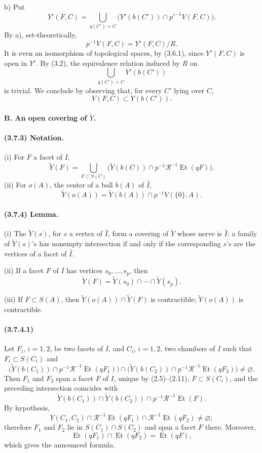 \documentclass[10pt]{article}
\begin{document}
b) Put
\[
Y'(F,C)=
\bigcup_{q(C')=C}
\bigl(Y'(b(C'))\cap p'^{-1}V(F,C)\bigr).
\]
By a), set-theoretically,
\[
p^{-1}V(F,C)=Y'(F,C)/R.
\]
It is even an isomorphism of topological spaces, by (3.6.1), since \(Y'(F,C)\) is open in \(Y'\). By (3.2), the equivalence relation induced by \(R\) on
\[
\bigcup_{q(C')=C}Y'(b(C'))
\]
is trivial. We conclude by observing that, for every \(C'\) lying over \(C\),
\[
V(F,C)\subset Y(b(C')).
\]

\paragraph{B. An open covering of \(\widetilde Y\).}

\paragraph{(3.7.3) Notation.} (i) For \(F\) a facet of \(I\),
\[
\widetilde Y(F)=
\bigcup_{F\subset S(C)}
\bigl(\widetilde Y(b(C))\cap p^{-1}\mathcal R^{-1}\operatorname{Et}(qF)\bigr).
\]
(ii) For \(o(A)\), the center of a ball \(b(A)\) of \(\widehat I\),
\[
\widetilde Y(o(A))=\widetilde Y(b(A))\cap p^{-1}V(\{0\},A).
\]

\paragraph{(3.7.4) Lemma.} (i) The \(\widetilde Y(s)\), for \(s\) a vertex of \(\widehat I\), form a covering of \(\widetilde Y\) whose nerve is \(\widehat I\): a family of \(\widetilde Y(s)\)'s has nonempty intersection if and only if the corresponding \(s\)'s are the vertices of a facet of \(\widehat I\).

(ii) If a facet \(F\) of \(I\) has vertices \(s_0,\ldots,s_p\), then
\[
\widetilde Y(F)=\widetilde Y(s_0)\cap\cdots\cap\widetilde Y(s_p).
\]

(iii) If \(F\subset S(A)\), then \(\widetilde Y(o(A))\cap\widetilde Y(F)\) is contractible; \(\widetilde Y(o(A))\) is contractible.

\paragraph{(3.7.4.1)} Let \(F_i\), \(i=1,2\), be two facets of \(I\), and \(C_i\), \(i=1,2\), two chambers of \(I\) such that \(F_i\subset S(C_i)\) and
\[
\bigl(\widetilde Y(b(C_1))\cap p^{-1}\mathcal R^{-1}\operatorname{Et}(qF_1)\bigr)
\cap
\bigl(\widetilde Y(b(C_2))\cap p^{-1}\mathcal R^{-1}\operatorname{Et}(qF_2)\bigr)
\ne\varnothing.
\]
Then \(F_1\) and \(F_2\) span a facet \(F\) of \(I\), unique by (2.5)--(2.11), \(F\subset S(C_i)\), and the preceding intersection coincides with
\[
\widetilde Y(b(C_1))\cap \widetilde Y(b(C_2))
\cap p^{-1}\mathcal R^{-1}\operatorname{Et}(F).
\]
By hypothesis,
\[
Y(C_1,C_2)\cap\mathcal R^{-1}\operatorname{Et}(qF_1)\cap
\mathcal R^{-1}\operatorname{Et}(qF_2)\ne\varnothing;
\]
therefore \(F_1\) and \(F_2\) lie in \(S(C_1)\cap S(C_2)\) and span a facet \(F\) there. Moreover,
\[
\operatorname{Et}(qF_1)\cap\operatorname{Et}(qF_2)=\operatorname{Et}(qF),
\]
which gives the announced formula.
\end{document}
